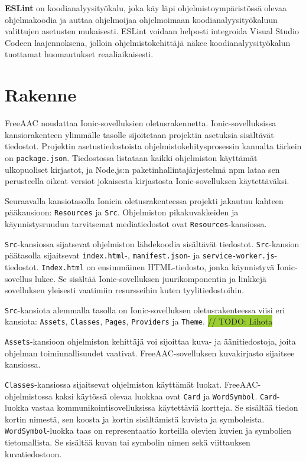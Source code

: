 \documentclass[utf8]{gradu3}
\begin{document}
\textbf{ESLint} on koodianalyysityökalu, joka käy läpi ohjelmistoympäristössä olevaa ohjelmakoodia ja auttaa ohjelmoijaa ohjelmoimaan koodianalyysityökaluun valittujen asetusten mukaisesti. ESLint voidaan helposti integroida Visual Studio Codeen laajennoksena, jolloin ohjelmistokehittäjä näkee koodianalyysityökalun tuottamat huomautukset reaaliaikaisesti.

\section{Rakenne}

FreeAAC noudattaa Ionic-sovelluksien oletusrakennetta. Ionic-sovelluksissa kansiorakenteen ylimmälle tasolle sijoitetaan projektin asetuksia sisältävät tiedostot. Projektin asetustiedostoista ohjelmistokehitysprosessin kannalta tärkein on \texttt{package.json}. Tiedostossa listataan kaikki ohjelmiston käyttämät ulkopuoliset kirjastot, ja Node.js:n paketinhallintajärjestelmä npm lataa sen perusteella oikeat versiot jokaisesta kirjastosta Ionic-sovelluksen käytettäväksi.

Seuraavalla kansiotasolla Ionicin oletusrakenteessa projekti jakautuu kahteen pääkansioon: \texttt{Resources} ja \texttt{Src}. Ohjelmiston pikakuvakkeiden ja käynnistysruudun tarvitsemat mediatiedostot ovat \texttt{Resources}-kansiossa.

\texttt{Src}-kansiossa sijatsevat ohjelmiston lähdekoodia sisältävät tiedostot. \texttt{Src}-kansion päätasolla sijaitsevat \texttt{index.html}-, \texttt{manifest.json}- ja \texttt{service-worker.js}-tiedostot. \texttt{Index.html} on ensimmäinen HTML-tiedosto, jonka käynnistyvä Ionic-sovellus lukee. Se sisältää Ionic-sovelluksen juurikomponentin ja linkkejä sovelluksen yleisesti vaatimiin resursseihin kuten tyylitiedostoihin.

\texttt{Src}-kansiota alemmalla tasolla on Ionic-sovelluksen oletusrakenteessa viisi eri kansiota: \texttt{Assets}, \texttt{Classes}, \texttt{Pages}, \texttt{Providers} ja \texttt{Theme}.   
 \colorbox{YellowGreen}{// TODO: Lihota}

\texttt{Assets}-kansioon ohjelmiston kehittäjä voi sijoittaa kuva- ja äänitiedostoja, joita ohjelman toiminnallisuudet vaativat. FreeAAC-sovelluksen kuvakirjasto sijaitsee kansiossa.

\texttt{Classes}-kansiossa sijaitsevat ohjelmiston käyttämät luokat. FreeAAC-ohjelmistossa kaksi käytössä olevaa luokkaa ovat \texttt{Card} ja \texttt{WordSymbol}. \texttt{Card}-luokka vastaa kommunikointisovelluksissa käytettäviä kortteja. Se sisältää tiedon kortin nimestä, sen koosta ja kortin sisältämistä kuvista ja symboleista. \texttt{WordSymbol}-luokka taas on representaatio korteilla olevien kuvien ja symbolien tietomallista. Se sisältää kuvan tai symbolin nimen sekä viittauksen kuvatiedostoon.
\end{document}

